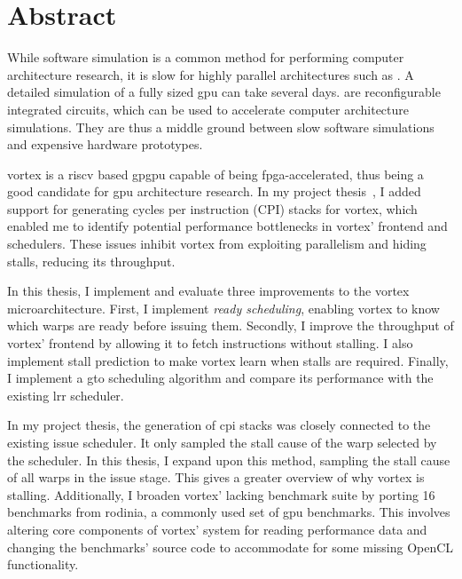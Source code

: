 \chapter*{Abstract}

While software simulation is a common method for performing computer architecture research, it is slow for highly parallel architectures such as . A detailed simulation of a fully sized \acrshort{gpu} can take several days.  are reconfigurable integrated circuits, which can be used to accelerate computer architecture simulations. They are thus a middle ground between slow software simulations and expensive hardware prototypes.

\Gls{vortex} is a \Gls{riscv} based \acrshort{gpgpu} capable of being \acrshort{fpga}-accelerated, thus being a good candidate for \acrshort{gpu} architecture research. In my project thesis~\cite{Aurud_Project}, I added support for generating cycles per instruction (CPI) stacks for \Gls{vortex}, which enabled me to identify potential performance bottlenecks in \Gls{vortex}' frontend and schedulers. These issues inhibit \Gls{vortex} from exploiting parallelism and hiding stalls, reducing its throughput.

In this thesis, I implement and evaluate three improvements to the \Gls{vortex} microarchitecture. First, I implement \textit{ready scheduling}, enabling \Gls{vortex} to know which warps are ready before issuing them. Secondly, I improve the throughput of \Gls{vortex}' frontend by allowing it to fetch instructions without stalling. I also implement stall prediction to make \Gls{vortex} learn when stalls are required. Finally, I implement a \acrfull{gto} scheduling algorithm and compare its performance with the existing \acrfull{lrr} scheduler.

In my project thesis, the generation of \acrshort{cpi} stacks was closely connected to the existing issue scheduler. It only sampled the stall cause of the warp selected by the scheduler. In this thesis, I expand upon this method, sampling the stall cause of all warps in the issue stage. This gives a greater overview of why \Gls{vortex} is stalling. Additionally, I broaden \Gls{vortex}' lacking benchmark suite by porting 16 benchmarks from \Gls{rodinia}, a commonly used set of \acrshort{gpu} benchmarks. This involves altering core components of \Gls{vortex}' system for reading performance data and changing the benchmarks' source code to accommodate for some missing OpenCL functionality. 

